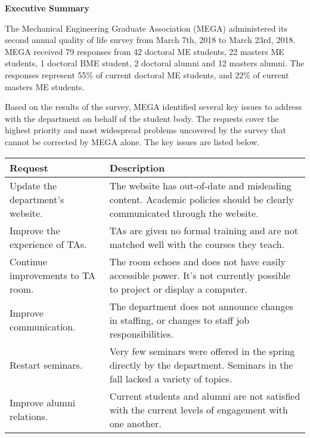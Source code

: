 
\pagestyle{empty} %
\begin{center}
\textbf{Executive Summary}
\end{center}

\singlespacing
The Mechanical Engineering Graduate Association (MEGA) administered its second annual quality of life survey from March 7th, 2018 to March 23rd, 2018. MEGA received 79 responses from 42 doctoral ME students, 22 masters ME students, 1 doctoral BME student, 2 doctoral alumni and 12 masters alumni. The responses represent 55\% of current doctoral ME students, and 22\% of current masters ME students.

Based on the results of the survey, MEGA identified several key issues to address with the department on behalf of the student body. The requests cover the highest priority and most widespread problems uncovered by the survey that cannot be corrected by MEGA alone. The key issues are listed below.

\noindent \begin{center}
\begin{tabular}{ | m{5.00cm} | m{9.0cm} | } 
\hline
\textbf{Request} & \textbf{Description} \\ 
\hline
Update the department's website. & The website has out-of-date and misleading content. Academic policies should be clearly communicated through the website. \\ 
\hline
Improve the experience of TAs. & TAs are given no formal training and are not matched well with the courses they teach. \\
\hline
Continue improvements to TA room. & The room echoes and does not have easily accessible power. It's not currently possible to project or display a computer. \\
\hline
Improve communication. & The department does not announce changes in staffing, or changes to staff job responsibilities. \\ 
\hline
Restart seminars. & Very few seminars were offered in the spring directly by the department. Seminars in the fall lacked a variety of topics. \\ 
\hline
Improve alumni relations. & Current students and alumni are not satisfied with the current levels of engagement with one another. \\ 
\hline
\end{tabular}
\end{center}
